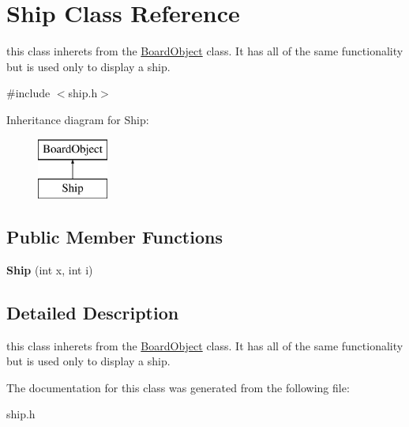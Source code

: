 \hypertarget{class_ship}{}\section{Ship Class Reference}
\label{class_ship}


this class inherets from the \hyperlink{class_board_object}{Board\+Object} class. It has all of the same functionality but is used only to display a ship.  




{\ttfamily \#include $<$ship.\+h$>$}

Inheritance diagram for Ship\+:\begin{figure}[H]
\begin{center}
\leavevmode
\includegraphics[height=2.000000cm]{class_ship}
\end{center}
\end{figure}
\subsection*{Public Member Functions}
\begin{DoxyCompactItemize}
\item 
\hypertarget{class_ship_ad0bf090f8303451940ea3c6ba0e3fe51}{}{\bfseries Ship} (int x, int i)\label{class_ship_ad0bf090f8303451940ea3c6ba0e3fe51}

\end{DoxyCompactItemize}


\subsection{Detailed Description}
this class inherets from the \hyperlink{class_board_object}{Board\+Object} class. It has all of the same functionality but is used only to display a ship. 

The documentation for this class was generated from the following file\+:\begin{DoxyCompactItemize}
\item 
ship.\+h\end{DoxyCompactItemize}
